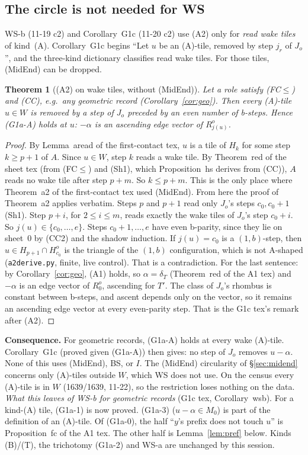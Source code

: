 \documentclass[11pt]{article}
\newtheorem{theorem}{Theorem}\newtheorem{lemma}[theorem]{Lemma}\newtheorem{proposition}[theorem]{Proposition}
\theoremstyle{definition}\newtheorem{definition}[theorem]{Definition}\newtheorem{remark}[theorem]{Remark}
\begin{document}
\subsection*{The circle is not needed for WS}
WS-b (11-19 c2) and Corollary~G1c (11-20 c2) use (A2) only for \emph{read wake tiles} of kind~(A). Corollary~G1c begins ``Let $u$ be an (A)-tile, removed by step $j_r$ of $J_o$'', and the three-kind dictionary classifies read wake tiles. For those tiles, (MidEnd) can be dropped.
\begin{theorem}[(A2) on wake tiles, without (MidEnd)]\label{thm:a2w}
Let a role satisfy (FC$\le$) and (CC), e.g.\ any geometric record (Corollary~\ref{cor:geo}). Then every (A)-tile $u\in W$ is removed by a step of $J_o$ preceded by an even number of b-steps. Hence (G1a-A) holds at $u$: $-\alpha$ is an ascending edge vector of $R^o_{j(u)}$.
\end{theorem}
\begin{proof}
By Lemma~aread of the first-contact tex, $u$ is a tile of $H_k$ for some step $k\ge p+1$ of $A$. Since $u\in W$, step $k$ reads a wake tile. By Theorem~red of the sheet tex (from (FC$\le$) and (Sh1), which Proposition~hs derives from (CC)), $A$ reads no wake tile after step $p+m$. So $k\le p+m$. This is the only place where Theorem~a2 of the first-contact tex used (MidEnd).
From here the proof of Theorem~a2 applies verbatim. Steps $p$ and $p+1$ read only $J_o$'s steps $c_0,c_0+1$ (Sh1). Step $p+i$, for $2\le i\le m$, reads exactly the wake tiles of $J_o$'s step $c_0+i$. So $j(u)\in\{c_0,\dots,e\}$. Steps $c_0+1,\dots,e$ have even b-parity, since they lie on sheet~$0$ by (CC2) and the shadow induction. If $j(u)=c_0$ is a $(1,b)$-step, then $u\in H_{p+1}\cap H^o_{c_0}$ is the triangle of the $(1,b)$ configuration, which is not A-shaped (\texttt{a2derive.py}, finite, live control). That is a contradiction.
For the last sentence: by Corollary~\ref{cor:geo}, (A1) holds, so $\alpha=\delta_T$ (Theorem~red of the A1 tex) and $-\alpha$ is an edge vector of $R^o_0$, ascending for $T'$. The class of $J_o$'s rhombus is constant between b-steps, and ascent depends only on the vector, so it remains an ascending edge vector at every even-parity step. That is the G1c tex's remark after (A2).
\end{proof}
\noindent\textbf{Consequence.} For geometric records, (G1a-A) holds at every wake (A)-tile. Corollary~G1c (proved given (G1a-A)) then gives: no step of $J_o$ removes $u-\alpha$. None of this uses (MidEnd), BS, or $I$. The (MidEnd) circularity of \S\ref{sec:midend} concerns only (A)-tiles outside $W$, which WS does not use. On the census every (A)-tile is in $W$ (1639/1639, 11-22), so the restriction loses nothing on the data.
\emph{What this leaves of WS-b for geometric records} (G1c tex, Corollary~wsb). For a kind-(A) tile, (G1a-1) is now proved. (G1a-3) ($u-\alpha\in M_0$) is part of the definition of an (A)-tile. Of (G1a-0), the half ``$y$'s prefix does not touch $u$'' is Proposition~fc of the A1 tex. The other half is Lemma~\ref{lem:pref} below. Kinds (B)/(T), the trichotomy (G1a-2) and WS-a are unchanged by this session.
\end{document}

